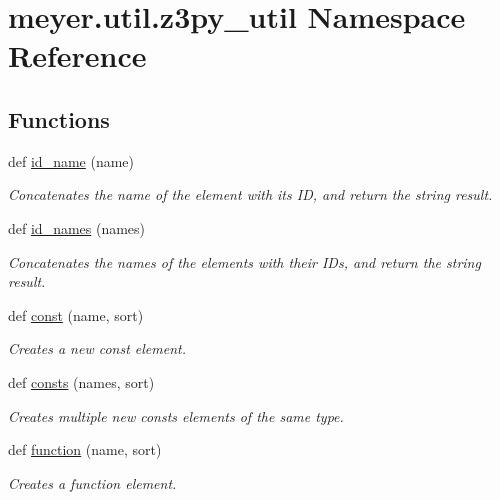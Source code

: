 \hypertarget{namespacemeyer_1_1util_1_1z3py__util}{}\section{meyer.\+util.\+z3py\+\_\+util Namespace Reference}
\label{namespacemeyer_1_1util_1_1z3py__util}
\subsection*{Functions}
\begin{DoxyCompactItemize}
\item 
def \hyperlink{namespacemeyer_1_1util_1_1z3py__util_ab669d0e9517ca9e314995cacdb9d451c}{id\+\_\+name} (name)
\begin{DoxyCompactList}\small\item\em Concatenates the name of the element with its ID, and return the string result. \end{DoxyCompactList}\item 
def \hyperlink{namespacemeyer_1_1util_1_1z3py__util_a8747354710be05db88bc9188dfa16b30}{id\+\_\+names} (names)
\begin{DoxyCompactList}\small\item\em Concatenates the names of the elements with their I\+Ds, and return the string result. \end{DoxyCompactList}\item 
def \hyperlink{namespacemeyer_1_1util_1_1z3py__util_a09fd9b270cf6714742578ca63a5cbb42}{const} (name, sort)
\begin{DoxyCompactList}\small\item\em Creates a new const element. \end{DoxyCompactList}\item 
def \hyperlink{namespacemeyer_1_1util_1_1z3py__util_a8565362aa72ebb1f4f22eb0950d08609}{consts} (names, sort)
\begin{DoxyCompactList}\small\item\em Creates multiple new consts elements of the same type. \end{DoxyCompactList}\item 
def \hyperlink{namespacemeyer_1_1util_1_1z3py__util_a347859270b8ef0d7bb63d7840aa5f4aa}{function} (name, sort)
\begin{DoxyCompactList}\small\item\em Creates a function element. \end{DoxyCompactList}\item 

\end{DoxyCompactItemize}

